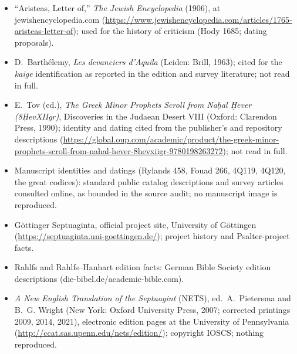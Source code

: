 \begin{itemize}
\item ``Aristeas, Letter of,'' \textit{The Jewish Encyclopedia} (1906),
at jewishencyclopedia.com
(\url{https://www.jewishencyclopedia.com/articles/1765-aristeas-letter-of});
used for the history of criticism (Hody 1685; dating proposals).
\item D.~Barth\'elemy, \textit{Les devanciers d'Aquila} (Leiden: Brill,
1963); cited for the \textit{kaige} identification as reported in the
edition and survey literature; not read in full.
\item E.~Tov (ed.), \textit{The Greek Minor Prophets Scroll from
Na\d{h}al \d{H}ever (8\d{H}evXIIgr)}, Discoveries in the Judaean Desert
VIII (Oxford: Clarendon Press, 1990); identity and dating cited from the
publisher's and repository descriptions
(\url{https://global.oup.com/academic/product/the-greek-minor-prophets-scroll-from-nahal-hever-8hevxiigr-9780198263272});
not read in full.
\item Manuscript identities and datings (Rylands 458, Fouad 266, 4Q119,
4Q120, the great codices): standard public catalog descriptions and
survey articles consulted online, as bounded in the source audit; no
manuscript image is reproduced.
\item G\"ottinger Septuaginta, official project site, University of
G\"ottingen (\url{https://septuaginta.uni-goettingen.de/}); project
history and Psalter-project facts.
\item Rahlfs and Rahlfs--Hanhart edition facts: German Bible Society
edition descriptions (die-bibel.de/academic-bible.com).
\item \textit{A New English Translation of the Septuagint} (NETS), ed.\
A.~Pietersma and B.~G. Wright (New York: Oxford University Press, 2007;
corrected printings 2009, 2014, 2021), electronic edition pages at the
University of Pennsylvania (\url{http://ccat.sas.upenn.edu/nets/edition/});
copyright IOSCS; nothing reproduced.
\end{itemize}
